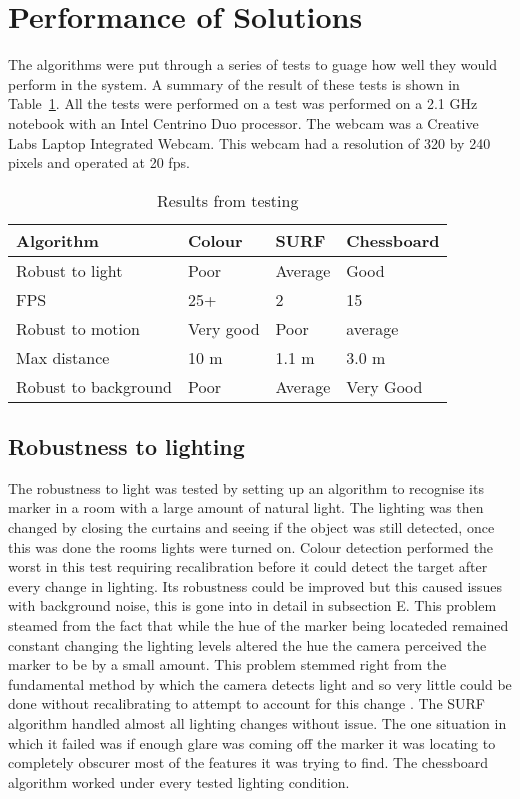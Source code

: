 \section{Performance of Solutions}
The algorithms were put through a series of tests to guage how well they would perform in the system. A summary of the result of these tests is shown in Table~\ref{results}. All the tests were performed on a test was performed on a 2.1 GHz notebook with an Intel Centrino Duo processor. The webcam was a Creative Labs Laptop Integrated Webcam. This webcam had a resolution of 320 by 240 pixels and operated at 20 fps.

\begin{table}
	\begin{center}
    	\begin{tabular}{ | l | l | l | p{2.5cm} |}
    	\hline
    	Algorithm & Colour & SURF & Chessboard \\ \hline
		Robust to light & Poor & Average & Good \\ \hline
		FPS & 25+ & 2 & 15 \\ \hline		
		Robust to motion & Very good & Poor & average \\ \hline		
		Max distance & 10 m & 1.1 m & 3.0 m \\ \hline
		Robust to background & Poor & Average & Very Good \\ \hline
    	\end{tabular}
	\end{center}
	
	\caption{Results from testing}
	\label{results}

\end{table}

\subsection{Robustness to lighting}
The robustness to light was tested by setting up an algorithm to recognise its marker in a room with a large amount of natural light. The lighting was then changed by closing the curtains and seeing if the object was still detected, once this was done the rooms lights were turned on. Colour detection performed the worst in this test requiring recalibration before it could detect the target after every change in lighting. Its robustness could be improved but this caused issues with background noise, this is gone into in detail in subsection E. This problem steamed from the fact that while the hue of the marker being locateded remained constant changing the lighting levels altered the hue the camera perceived the marker to be by a small amount. This problem stemmed right from the fundamental method by which the camera detects light and so very little could be done without recalibrating to attempt to account for this change \cite{detect}. The SURF algorithm handled almost all lighting changes without issue. The one situation in which it failed was if enough glare was coming off the marker it was locating to completely obscurer most of the features it was trying to find. The chessboard algorithm worked under every tested lighting condition.

